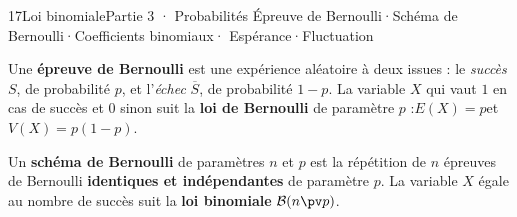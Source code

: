
\begin{ouverture}[binomiale]{17}{Loi binomiale}{Partie 3 · Probabilités}
  {Épreuve de Bernoulli\enspace·\enspace Schéma de Bernoulli\enspace·\enspace Coefficients binomiaux\enspace·\enspace
   Espérance\enspace·\enspace Fluctuation}
\end{ouverture}

\essentiel


\begin{definition}
Une \textbf{épreuve de Bernoulli} est une expérience aléatoire à deux issues : le \emph{succès} $S$, de probabilité $p$, et
l'\emph{échec} $\overline S$, de probabilité $1-p$. La variable $X$ qui vaut $1$ en cas de succès et $0$ sinon suit la
\textbf{loi de Bernoulli} de paramètre $p$ :\qquad $E(X)=p$\qquad et\qquad $V(X)=p(1-p)$.
\end{definition}


\begin{definition}
Un \textbf{schéma de Bernoulli} de paramètres $n$ et $p$ est la répétition de $n$ épreuves de Bernoulli \textbf{identiques et
indépendantes} de paramètre $p$. La variable $X$ égale au nombre de succès suit la \textbf{loi binomiale} $\mathcal{B}(n\pv p)$.
\end{definition}

